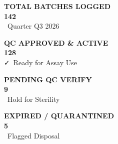 \documentclass[10pt,a4paper]{article}
\begin{document}
\begin{minipage}[t]{0.238\textwidth}
  \begin{tcolorbox}[labcard, colframe=labblue, colback=labblue!5!white]
    \centering
    {\tiny\bfseries\color{labblue} TOTAL BATCHES LOGGED}\\[1pt]
    {\Large\bfseries\color{labnavy} 142}\\[1pt]
    {\tiny\color{labtext}\faCalendar\ Quarter Q3 2026}
  \end{tcolorbox}
\end{minipage}%
\hfill
\begin{minipage}[t]{0.238\textwidth}
  \begin{tcolorbox}[labcard, colframe=labgreen, colback=labgreen!5!white]
    \centering
    {\tiny\bfseries\color{labgreen} QC APPROVED \& ACTIVE}\\[1pt]
    {\Large\bfseries\color{labgreen} 128}\\[1pt]
    {\tiny\color{labtext}\faCheck\ Ready for Assay Use}
  \end{tcolorbox}
\end{minipage}%
\hfill
\begin{minipage}[t]{0.238\textwidth}
  \begin{tcolorbox}[labcard, colframe=labamber, colback=labamber!5!white]
    \centering
    {\tiny\bfseries\color{labamber} PENDING QC VERIFY}\\[1pt]
    {\Large\bfseries\color{labamber} 9}\\[1pt]
    {\tiny\color{labtext}\faClock\ Hold for Sterility}
  \end{tcolorbox}
\end{minipage}%
\hfill
\begin{minipage}[t]{0.238\textwidth}
  \begin{tcolorbox}[labcard, colframe=labred, colback=labred!5!white]
    \centering
    {\tiny\bfseries\color{labred} EXPIRED / QUARANTINED}\\[1pt]
    {\Large\bfseries\color{labred} 5}\\[1pt]
    {\tiny\color{labtext}\faExclamationTriangle\ Flagged Disposal}
  \end{tcolorbox}
\end{minipage}

\vspace{1pt}
\end{document}
